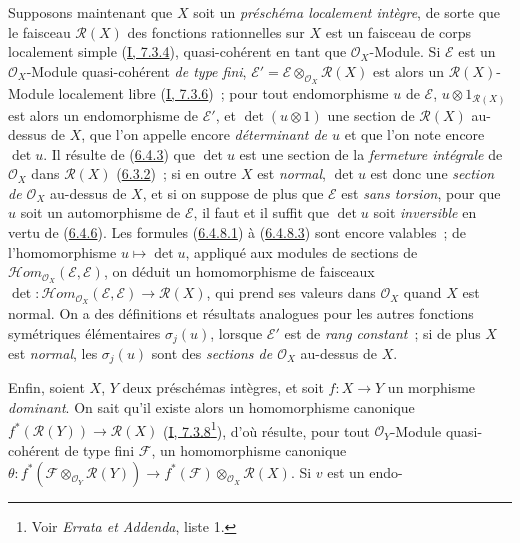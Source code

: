 \begin{env}[6.4.9]
\label{II.6.4.9-fr}
Supposons maintenant que $X$ soit un \emph{préschéma localement intègre}, de
sorte que le faisceau $\mathcal{R}(X)$ des fonctions rationnelles sur $X$ est
un faisceau de corps localement simple (\hyperref[I.7.3.4-fr]{I, 7.3.4}),
quasi-cohérent en tant que $\mathcal{O}_X$-Module. Si $\mathcal{E}$ est un
$\mathcal{O}_X$-Module quasi-cohérent \emph{de type fini},
$\mathcal{E}'=\mathcal{E}\otimes_{\mathcal{O}_X}\mathcal{R}(X)$ est alors un
$\mathcal{R}(X)$-Module localement libre
(\hyperref[I.7.3.6-fr]{I, 7.3.6})~; pour tout endomorphisme $u$ de
$\mathcal{E}$, $u\otimes1_{\mathcal{R}(X)}$ est alors un endomorphisme de
$\mathcal{E}'$, et $\det(u\otimes1)$ une section de $\mathcal{R}(X)$ au-dessus
de $X$, que l'on appelle encore \emph{déterminant de $u$} et que l'on note
encore $\det u$. Il résulte de (\hyperref[II.6.4.3-fr]{6.4.3}) que $\det u$ est
une section de la \emph{fermeture intégrale} de $\mathcal{O}_X$ dans
$\mathcal{R}(X)$ (\hyperref[II.6.3.2-fr]{6.3.2})~; si en outre $X$ est
\emph{normal}, $\det u$ est donc une \emph{section de $\mathcal{O}_X$}
au-dessus de $X$, et si on suppose de plus que $\mathcal{E}$ est \emph{sans
torsion}, pour que $u$ soit un automorphisme de $\mathcal{E}$, il faut et il
suffit que $\det u$ soit \emph{inversible} en vertu de
(\hyperref[II.6.4.6-fr]{6.4.6}). Les formules
(\hyperref[II.6.4.8.1-fr]{6.4.8.1}) à
(\hyperref[II.6.4.8.3-fr]{6.4.8.3}) sont encore valables~; de l'homomorphisme
$u\mapsto\det u$, appliqué aux modules de sections de
$\mathcal{H}om_{\mathcal{O}_X}(\mathcal{E},\mathcal{E})$, on déduit un
homomorphisme de faisceaux
$\det:\mathcal{H}om_{\mathcal{O}_X}(\mathcal{E},\mathcal{E})
\to\mathcal{R}(X)$, qui prend ses valeurs dans $\mathcal{O}_X$ quand $X$ est
normal. On a des définitions et résultats analogues pour les autres fonctions
symétriques élémentaires $\sigma_j(u)$, lorsque $\mathcal{E}'$ est de
\emph{rang constant}~; si de plus $X$ est \emph{normal}, les $\sigma_j(u)$
sont des \emph{sections de $\mathcal{O}_X$} au-dessus de $X$.

Enfin, soient $X$, $Y$ deux préschémas intègres, et soit $f:X\to Y$ un
morphisme \emph{dominant}. On sait qu'il existe alors un homomorphisme
canonique $f^*(\mathcal{R}(Y))\to\mathcal{R}(X)$
(\hyperref[I.7.3.8-fr]{I, 7.3.8}\footnote{Voir \emph{Errata et Addenda},
liste 1.}), d'où résulte, pour tout
$\mathcal{O}_Y$-Module quasi-cohérent de type fini $\mathcal{F}$, un
homomorphisme canonique
$\theta:f^*(\mathcal{F}\otimes_{\mathcal{O}_Y}\mathcal{R}(Y))
\to f^*(\mathcal{F})\otimes_{\mathcal{O}_X}\mathcal{R}(X)$. Si $v$ est un
endo-


\end{env}
